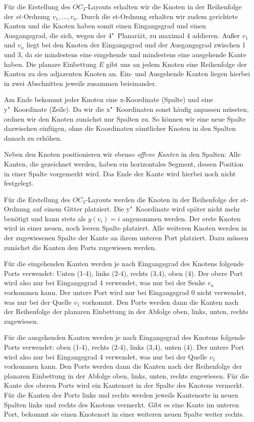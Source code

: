 \documentclass[a4paper]{scrreprt}
\theoremstyle{definition}
\begin{document}
\cite{liu+etal-98} \cite{biedl+kant-98}

Für die Erstellung des $OC_3$-Layouts erhalten wir die Knoten in der Reihenfolge der $st$-Ordnung $v_1, \dots, v_n$. Durch die st-Ordnung erhalten wir zudem gerichtete Kanten und die Knoten haben somit einen Eingangsgrad und einen Ausgangsgrad, die sich, wegen der 4"~Planariät, zu maximal 4 addieren. Außer $v_1$ und $v_n$ liegt bei den Knoten der Eingangsgrad und der Ausgangsgrad zwischen 1 und 3, da sie mindestens eine eingehende und mindestens eine ausgehende Kante haben. Die planare Einbettung $E$ gibt uns an jedem Knoten eine Reihenfolge der Kanten zu den adjazenten Knoten an. Ein- und Ausgehende Kanten liegen hierbei in zwei Abschnitten jeweils zusammen beieinander.

Am Ende bekommt jeder Knoten eine x-Koordinate (Spalte) und eine y"~Koordinate (Zeile). Da wir die x"~Koordinaten sonst häufig anpassen müssten, ordnen wir den Knoten zunächst nur Spalten zu. So können wir eine neue Spalte dazwischen einfügen, ohne die Koordinaten sämtlicher Knoten in den Spalten danach zu erhöhen. 

Neben den Knoten positionieren wir ebenso \emph{offene Kanten} in den Spalten: Alle Kanten, die gezeichnet werden, haben ein horizontales Segment, dessen Position in einer Spalte vorgemerkt wird. Das Ende der Kante wird hierbei noch nicht festgelegt. %

Für die Erstellung des $OC_3$-Layouts werden die Knoten in der Reihenfolge der st-Ordnung auf einem Gitter platziert. Die y"~Koordinate wird später nicht mehr benötigt und kann stets als $y(v_i) = i$ angenommen werden. Der erste Knoten wird in einer neuen, noch leeren Spalte platziert. Alle weiteren Knoten werden in der zugewiesenen Spalte der Kante an ihrem unteren Port platziert. Dazu müssen zunächst die Kanten den Ports zugewiesen werden.

Für die eingehenden Kanten werden je nach Eingangsgrad des Knotens folgende Ports verwendet: Unten (1-4), links (2-4), rechts (3,4), oben (4). Der obere Port wird also nur bei Eingangsgrad 4 verwendet, was nur bei der Senke $v_n$ vorkommen kann. Der untere Port wird nur bei Eingangsgrad 0 nicht verwendet, was nur bei der Quelle $v_1$ vorkommt. Den Ports werden dann die Kanten nach der Reihenfolge der planaren Einbettung in der Abfolge oben, links, unten, rechts zugewiesen.

Für die ausgehenden Kanten werden je nach Eingangsgrad des Knotens folgende Ports verwendet: oben (1-4), rechts (2-4), links (3,4), unten (4). Der untere Port wird also nur bei Eingangsgrad 4 verwendet, was nur bei der Quelle $v_1$ vorkommen kann. Den Ports werden dann die Kanten nach der Reihenfolge der planaren Einbettung in der Abfolge oben, links, unten, rechts zugewiesen. 
Für die Kante des oberen Ports wird ein Kantenort in der Spalte des Knotens vermerkt. Für die Kanten der Ports links und rechts werden jeweils Kantenorte in neuen Spalten links und rechts des Knotens vermerkt. Gibt es eine Kante im unteren Port, bekommt sie einen Knotenort in einer weiteren neuen Spalte weiter rechts. %
\end{document}
